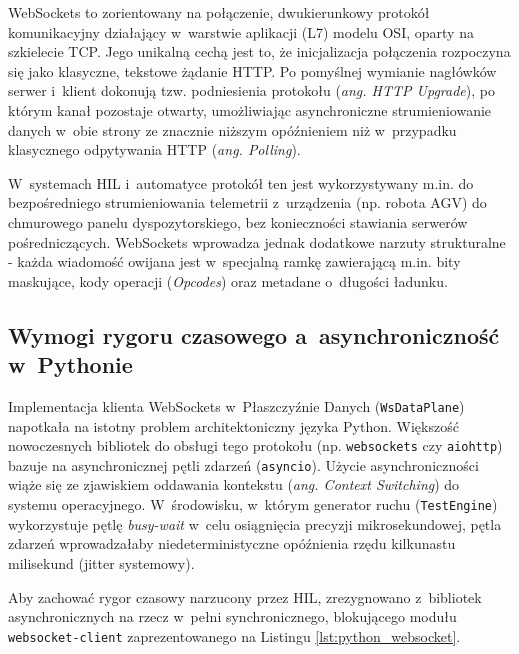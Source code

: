 WebSockets to zorientowany na połączenie, dwukierunkowy protokół komunikacyjny działający w~warstwie aplikacji (L7) modelu OSI, oparty na szkielecie TCP.
Jego unikalną cechą jest to, że inicjalizacja połączenia rozpoczyna się jako klasyczne, tekstowe żądanie HTTP.
Po pomyślnej wymianie nagłówków serwer i~klient dokonują tzw. podniesienia protokołu (\textit{ang. HTTP Upgrade}), po którym kanał pozostaje otwarty, umożliwiając asynchroniczne strumieniowanie danych w~obie strony ze znacznie niższym opóźnieniem niż w~przypadku klasycznego odpytywania HTTP (\textit{ang. Polling}).

W~systemach HIL i~automatyce protokół ten jest wykorzystywany m.in. do bezpośredniego strumieniowania telemetrii z~urządzenia (np. robota AGV) do chmurowego panelu dyspozytorskiego, bez konieczności stawiania serwerów pośredniczących.
WebSockets wprowadza jednak dodatkowe narzuty strukturalne - każda wiadomość owijana jest w~specjalną ramkę zawierającą m.in. bity maskujące, kody operacji (\textit{Opcodes}) oraz metadane o~długości ładunku.

\subsection{Wymogi rygoru czasowego a~asynchroniczność w~Pythonie}
Implementacja klienta WebSockets w~Płaszczyźnie Danych (\texttt{WsDataPlane}) napotkała na istotny problem architektoniczny języka Python.
Większość nowoczesnych bibliotek do obsługi tego protokołu (np. \texttt{websockets} czy \texttt{aiohttp}) bazuje na asynchronicznej pętli zdarzeń (\texttt{asyncio}).
Użycie asynchroniczności wiąże się ze zjawiskiem oddawania kontekstu (\textit{ang. Context Switching}) do systemu operacyjnego.
W~środowisku, w~którym generator ruchu (\texttt{TestEngine}) wykorzystuje pętlę \textit{busy-wait} w~celu osiągnięcia precyzji mikrosekundowej, pętla zdarzeń wprowadzałaby niedeterministyczne opóźnienia rzędu kilkunastu milisekund (jitter systemowy).

Aby zachować rygor czasowy narzucony przez HIL, zrezygnowano z~bibliotek asynchronicznych na rzecz w~pełni synchronicznego, blokującego modułu \texttt{websocket-client} zaprezentowanego na Listingu \ref{lst:python_websocket}.

